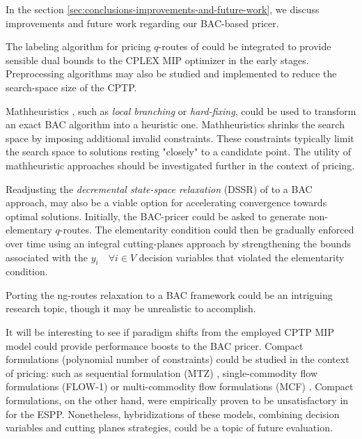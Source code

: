 In the section \cref{sec:conclusions-improvements-and-future-work}, we discuss improvements and future work regarding our BAC-based pricer.

The labeling algorithm for pricing $q$-routes of \textcite{desrochers1992} could be integrated to provide sensible dual bounds to the CPLEX MIP optimizer in the early stages.
Preprocessing algorithms may also be studied and implemented to reduce the search-space size of the CPTP.

Mathheuristics \parencite{fischetti2018}, such as \textit{local branching} \parencite{fischetti2003} or \textit{hard-fixing}, could be used to transform an exact BAC algorithm into a heuristic one.
Mathheuristics shrinks the search space by imposing additional invalid constraints.
These constraints typically limit the search space to solutions resting "closely" to a candidate point.
The utility of mathheuristic approaches should be investigated further in the context of pricing.

Readjusting the \textit{decremental state-space relaxation} (DSSR) of \textcite{boland2006, righini2008, martinelli2014} to a BAC approach, may also be a viable option for accelerating convergence towards optimal solutions.
Initially, the BAC-pricer could be asked to generate non-elementary $q$-routes.
The elementarity condition could then be gradually enforced over time using an integral cutting-planes approach by strengthening the bounds associated with the $y_i \quad \forall i \in V$ decision variables that violated the elementarity condition.

Porting the ng-routes relaxation \parencite{baldacci2011} to a BAC framework could be an intriguing research topic, though it may be unrealistic to accomplish.


It will be interesting to see if paradigm shifts from the employed CPTP MIP model could provide performance boosts to the BAC pricer. Compact formulations (polynomial number of constraints) could be studied in the context of pricing: such as sequential formulation (MTZ) \parencite{miller1960}, single-commodity flow formulations (FLOW-1) \parencite{gavish1978travelling} or multi-commodity flow formulations (MCF) \parencite{wong1980integer,claus1984new}.
Compact formulations, on the other hand, were empirically proven to be unsatisfactory in \textcite{taccari2016} for the ESPP. Nonetheless, hybridizations of these models, combining decision variables and cutting planes strategies, could be a topic of future evaluation.




